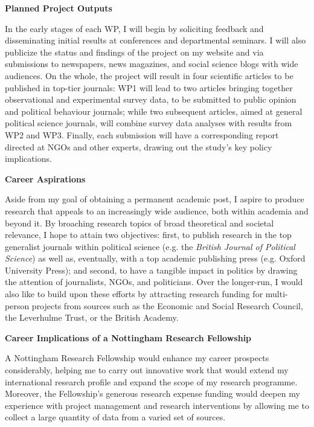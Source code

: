 \documentclass[fontsize=10.5pt,letterpaper]{scrartcl}
\begin{document}
\textbf{Planned Project Outputs}
\vspace{-.9em}

In the early stages of each WP, I will begin by soliciting feedback and disseminating initial results at conferences and departmental seminars. I will also publicize the status and findings of the project on my website and via submissions to newspapers, news magazines, and social science blogs with wide audiences. On the whole, the project will result in four scientific articles to be published in top-tier journals: WP1 will lead to two articles bringing together observational and experimental survey data, to be submitted to public opinion and political behaviour journals; while two subsequent articles, aimed at general political science journals, will combine survey data analyses with results from WP2 and WP3. Finally, each submission will have a corresponding report directed at NGOs and other experts, drawing out the study’s key policy implications.

\textbf{Career Aspirations}
\vspace{-.9em}

Aside from my goal of obtaining a permanent academic post, I aspire to produce research that appeals to an increasingly wide audience, both within academia and beyond it. By broaching research topics of broad theoretical and societal relevance, I hope to attain two objectives: first, to publish research in the top generalist journals within political science (e.g. the \textit{British Journal of Political Science}) as well as, eventually, with a top academic publishing press (e.g. Oxford University Press); and second, to have a tangible impact in politics by drawing the attention of journalists, NGOs, and politicians. Over the longer-run, I would also like to build upon these efforts by attracting research funding for multi-person projects from sources such as the Economic and Social Research Council, the Leverhulme Trust, or the British Academy.

\textbf{Career Implications of a Nottingham Research Fellowship}
\vspace{-.9em}

A Nottingham Research Fellowship would enhance my career prospects considerably, helping me to carry out innovative work that would extend my international research profile and expand the scope of my research programme. Moreover, the Fellowship’s generous research expense funding would deepen my experience with project management and research interventions by allowing me to collect a large quantity of data from a varied set of sources.
\end{document}
